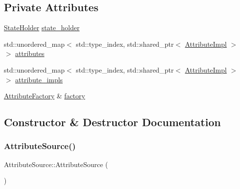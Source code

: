 \subsection*{Private Attributes}
\begin{DoxyCompactItemize}
\item 
\mbox{\hyperlink{classlucene_1_1core_1_1util_1_1AttributeSource_1_1StateHolder}{State\+Holder}} \mbox{\hyperlink{classlucene_1_1core_1_1util_1_1AttributeSource_a62ac9cefce936c5e903da6f3d9c9f31c}{state\+\_\+holder}}
\item 
std\+::unordered\+\_\+map$<$ std\+::type\+\_\+index, std\+::shared\+\_\+ptr$<$ \mbox{\hyperlink{classlucene_1_1core_1_1util_1_1AttributeImpl}{Attribute\+Impl}} $>$ $>$ \mbox{\hyperlink{classlucene_1_1core_1_1util_1_1AttributeSource_aa1994ef1eaa78a84c4371a0a286b5c69}{attributes}}
\item 
std\+::unordered\+\_\+map$<$ std\+::type\+\_\+index, std\+::shared\+\_\+ptr$<$ \mbox{\hyperlink{classlucene_1_1core_1_1util_1_1AttributeImpl}{Attribute\+Impl}} $>$ $>$ \mbox{\hyperlink{classlucene_1_1core_1_1util_1_1AttributeSource_afd81d39723b99832ecafe9aa538181e3}{attribute\+\_\+impls}}
\item 
\mbox{\hyperlink{classlucene_1_1core_1_1util_1_1AttributeFactory}{Attribute\+Factory}} \& \mbox{\hyperlink{classlucene_1_1core_1_1util_1_1AttributeSource_a1376420a752f337a0fdb582bdf160eba}{factory}}
\end{DoxyCompactItemize}


\subsection{Constructor \& Destructor Documentation}
\mbox{\label{classlucene_1_1core_1_1util_1_1AttributeSource_aef30fddd7e976cf96938778e73ebba1f}} 
\subsubsection{\texorpdfstring{Attribute\+Source()}{AttributeSource()}\hspace{0.1cm}{\footnotesize\ttfamily [1/3]}}
{\footnotesize\ttfamily Attribute\+Source\+::\+Attribute\+Source (\begin{DoxyParamCaption}{ }\end{DoxyParamCaption})}

